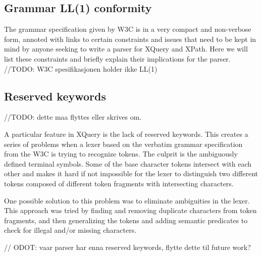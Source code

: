 \subsection{Grammar LL(1) conformity}
The grammar specification given by W3C is in a very compact and non-verbose
form, annoted with links to certain constraints and issues that need to be kept
in mind by anyone seeking to write a parser for XQuery and XPath. Here we will
list these constraints and briefly explain their implications for the parser.
//TODO: W3C spesifikasjonen holder ikke LL(1)

\subsection{Reserved keywords}
//TODO: dette maa flyttes eller skrives om.

A particular feature in XQuery is the lack of reserved keywords. This creates a
series of problems when a lexer based on the verbatim grammar specification from
the W3C is trying to recognize tokens. The culprit is the ambiguously defined
terminal symbols. Some of the base character tokens intersect with each other
and makes it hard if not impossible for the lexer to distinguish two different
tokens composed of different token fragments with intersecting characters.

One possible solution to this problem was to eliminate ambiguities in the lexer.
This approach was tried by finding and removing duplicate characters from token
fragments, and then generalizing the tokens and adding semantic predicates to
check for illegal and/or missing characters.

// ODOT: vaar parser har enna reserved keywords, flytte dette til future work?



